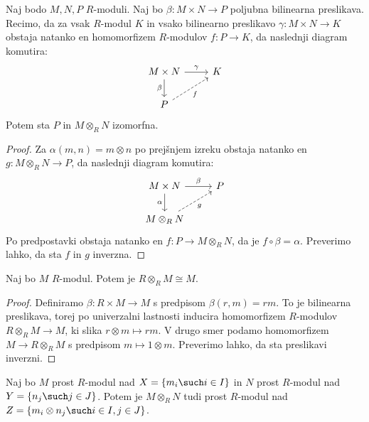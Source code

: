 
\begin{izrek}
  Naj bodo $M, N, P$ $R$-moduli.
  Naj bo $\beta: M \times N \to P$ poljubna bilinearna preslikava.
  Recimo, da za vsak $R$-modul $K$ in vsako bilinearno preslikavo $\gamma: M
  \times N \to K$ obstaja natanko en homomorfizem $R$-modulov $f: P \to K$, da
  naslednji diagram komutira:
  \[\begin{tikzcd}
	  {M \times N} & K \\
	  P
	  \arrow["\gamma", from=1-1, to=1-2]
	  \arrow["\beta"', from=1-1, to=2-1]
	  \arrow["f"', dashed, from=2-1, to=1-2]
	\end{tikzcd}\]
  Potem sta $P$ in $M \otimes_R N$ izomorfna.
\end{izrek}

\begin{proof}
  Za $\alpha(m, n) = m \otimes n$ po prejšnjem izreku obstaja natanko en $g: M
  \otimes_R N \to P$, da naslednji diagram komutira:
  \[\begin{tikzcd}
	  {M \times N} & P \\
	  {M \otimes_R N}
	  \arrow["\beta", from=1-1, to=1-2]
	  \arrow["\alpha"', from=1-1, to=2-1]
	  \arrow["g"', dashed, from=2-1, to=1-2]
	\end{tikzcd}\]
  Po predpostavki obstaja natanko en $f: P \to M \otimes_R N$, da je $f\circ
  \beta = \alpha$.
  Preverimo lahko, da sta $f$ in $g$ inverzna.
\end{proof}

\begin{trditev}
  Naj bo $M$ $R$-modul.
  Potem je $R \otimes_R M \cong M$.
\end{trditev}

\begin{proof}
  Definiramo $\beta: R \times M \to M$ s predpisom $\beta(r,m) = rm$.
  To je bilinearna preslikava, torej po univerzalni lastnosti inducira
  homomorfizem $R$-modulov $R \otimes_R M \to M$, ki slika $r \otimes m \mapsto
  rm$.
  V drugo smer podamo homomorfizem $M \to R \otimes_R M$ s predpisom $m \mapsto
  1 \otimes m$.
  Preverimo lahko, da sta preslikavi inverzni.
\end{proof}


\begin{izrek}
  Naj bo $M$ prost $R$-modul nad $X = \{m_i \such i \in I\}$ in $N$ prost
  $R$-modul nad $Y = \{n_j \such j \in J\}$.
  Potem je $M \otimes_R N$ tudi prost $R$-modul nad $Z = \{m_i \otimes n_j \such
  i \in I, j \in J\}$.
\end{izrek}

